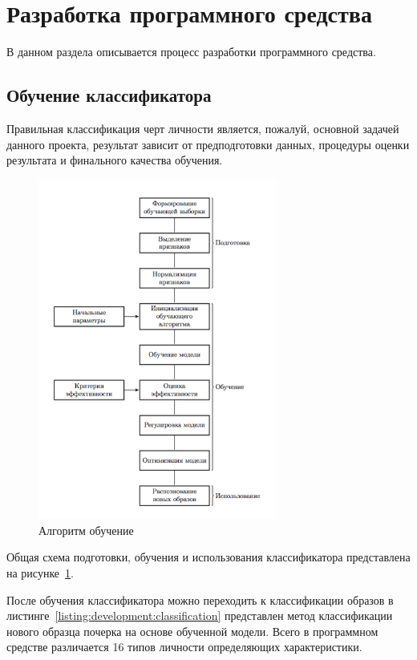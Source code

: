 \section{Разработка программного средства}

В данном раздела описывается процесс разработки программного средства.
\subsection{Обучение классификатора}
Правильная классификация черт личности является, пожалуй, основной задачей данного проекта, результат зависит от предподготовки данных, процедуры оценки результата и финального качества обучения.

\begin{figure}[h]
    \centering
    \includegraphics[width=0.7\textwidth]{figures/SVM_flow.png}
    \caption{Алгоритм обучение}
    \label{fig:develoipment:svm_flow}
\end{figure}

Общая схема подготовки, обучения и использования классификатора представлена на рисунке~\ref{fig:develoipment:svm_flow}.

После обучения классификатора можно переходить к классификации образов в листинге~\ref{listing:development:classification} представлен метод классификации нового образца почерка на основе обученной модели. Всего в программном средстве различается 16 типов личности определяющих характеристики.


